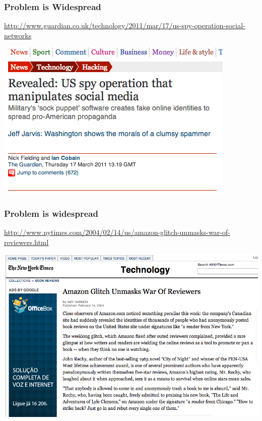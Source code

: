 \documentclass[t]{beamer}
\begin{document}
\begin{frame} \frametitle{Problem is Widespread} %


\begin{block}{\url{http://www.guardian.co.uk/technology/2011/mar/17/us-spy-operation-social-networks}} 

\begin{center}
     \includegraphics[width=\textwidth]{us-spy-operation}
\end{center}

\end{block}


\end{frame}



\begin{frame} \frametitle{Problem is widespread} %


\begin{block}{\url{http://www.nytimes.com/2004/02/14/us/amazon-glitch-unmasks-war-of-reviewers.html}} 

\begin{center}
     \includegraphics[width=\textwidth]{nytimes-war-reviewers}
\end{center}

\end{block}


\end{frame}
\end{document}
